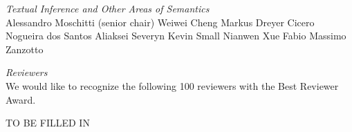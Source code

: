 \emph{Textual Inference and Other Areas of Semantics} \\
\hspace*{0.2in}Alessandro Moschitti (senior chair)
\hspace*{0.2in}Weiwei Cheng
\hspace*{0.2in}Markus Dreyer
\hspace*{0.2in}Cicero Nogueira dos Santos
\hspace*{0.2in}Aliaksei Severyn
\hspace*{0.2in}Kevin Small
\hspace*{0.2in}Nianwen Xue
\hspace*{0.2in}Fabio Massimo Zanzotto


\emph{Reviewers} \\
\hspace*{0.2in}We would like to recognize the following 100 reviewers with the Best Reviewer Award.\\

    
    \begin{addmargin}[0.2in]{0em}
TO BE FILLED IN
    \end{addmargin}
